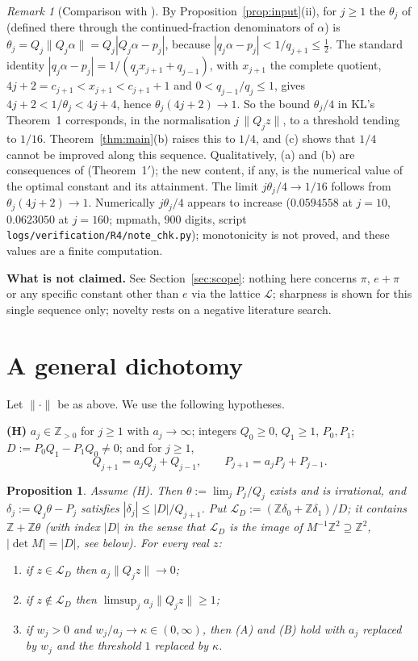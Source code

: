 \documentclass[11pt]{amsart}
\newtheorem{proposition}[theorem]{Proposition}
\theoremstyle{remark}
\newtheorem{remark}[theorem]{Remark}
\newcommand{\Z}{\mathbb{Z}}
\newcommand{\dist}[1]{\lVert #1\rVert}
\newcommand{\LL}{\mathcal{L}}
\begin{document}
\begin{remark}[Comparison with \cite{KL}]
By Proposition~\ref{prop:input}(ii), for $j\ge1$ the $\theta_j$ of \cite{KL} (defined there through the
continued-fraction denominators of $\alpha$) is $\theta_j=Q_j\dist{Q_j\alpha}=Q_j|Q_j\alpha-p_j|$, because
$|q_j\alpha-p_j|<1/q_{j+1}\le\frac12$. The standard identity $|q_j\alpha-p_j|=1/(q_jx_{j+1}+q_{j-1})$,
with $x_{j+1}$ the complete quotient, $4j+2=c_{j+1}<x_{j+1}<c_{j+1}+1$ and $0<q_{j-1}/q_j\le1$, gives
$4j+2<1/\theta_j<4j+4$, hence $\theta_j(4j+2)\to1$. So the
bound $\theta_j/4$ in KL's Theorem~1 corresponds, in the normalisation $j\,\dist{Q_jz}$, to a
threshold tending to $1/16$. Theorem~\ref{thm:main}(b) raises this to $1/4$, and (c)
shows that $1/4$ cannot be improved along this sequence. Qualitatively, (a) and (b) are
consequences of \cite{KL} (Theorem~1$'$);
the new content, if any, is the numerical value of the optimal constant and its attainment. The limit $j\theta_j/4\to1/16$ follows from
$\theta_j(4j+2)\to1$. Numerically $j\theta_j/4$ appears to increase ($0.0594558$ at $j=10$,
$0.0623050$ at $j=160$; mpmath, 900 digits, script \texttt{logs/verification/R4/note\_chk.py});
monotonicity is not proved, and these values are a finite computation.
\end{remark}

\medskip
\noindent\textbf{What is not claimed.} See Section~\ref{sec:scope}: nothing here concerns $\pi$,
$e+\pi$ or any specific constant other than $e$ via the lattice $\LL$; sharpness is shown
for this single sequence only; novelty rests on a negative literature search.

\section{A general dichotomy}\label{sec:dichotomy}

Let $\|\cdot\|$ be as above. We use the following hypotheses.

\medskip
\noindent\textbf{(H)} $a_j\in\Z_{>0}$ for $j\ge1$ with $a_j\to\infty$; integers $Q_0\ge0$, $Q_1\ge1$,
$P_0,P_1$; $D:=P_0Q_1-P_1Q_0\ne0$; and for $j\ge1$,
\[
Q_{j+1}=a_jQ_j+Q_{j-1},\qquad P_{j+1}=a_jP_j+P_{j-1}.
\]

\begin{proposition}\label{prop:dich}
Assume (H). Then $\theta:=\lim_j P_j/Q_j$ exists and is irrational, and
$\delta_j:=Q_j\theta-P_j$ satisfies $|\delta_j|\le|D|/Q_{j+1}$. Put
$\LL_D:=(\Z\delta_0+\Z\delta_1)/D$; it contains $\Z+\Z\theta$ (with index $|D|$ in the sense that
$\LL_D$ is the image of $M^{-1}\Z^2\supseteq\Z^2$, $|\det M|=|D|$, see below). For every real $z$:
\begin{enumerate}
\item[(A)] if $z\in\LL_D$ then $a_j\dist{Q_jz}\to0$;
\item[(B)] if $z\notin\LL_D$ then $\limsup_j a_j\dist{Q_jz}\ge1$;
\item[(C)] if $w_j>0$ and $w_j/a_j\to\kappa\in(0,\infty)$, then (A) and (B) hold with $a_j$
replaced by $w_j$ and the threshold $1$ replaced by $\kappa$.
\end{enumerate}
\end{proposition}
\end{document}
